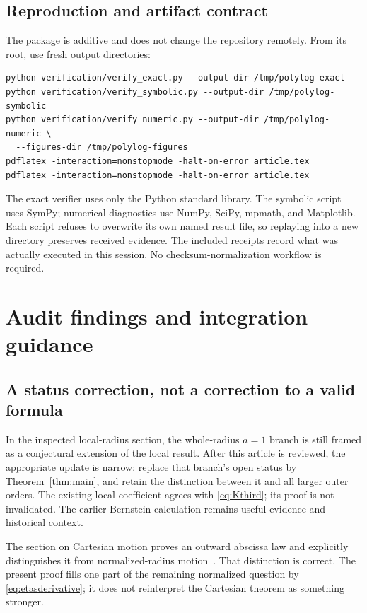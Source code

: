 \documentclass[11pt]{article}
\numberwithin{equation}{section}
\theoremstyle{definition}
\theoremstyle{remark}
\begin{document}
\subsection{Reproduction and artifact contract}
The package is additive and does not change the repository remotely.
From its root, use fresh output directories:
\begin{verbatim}
python verification/verify_exact.py --output-dir /tmp/polylog-exact
python verification/verify_symbolic.py --output-dir /tmp/polylog-symbolic
python verification/verify_numeric.py --output-dir /tmp/polylog-numeric \
  --figures-dir /tmp/polylog-figures
pdflatex -interaction=nonstopmode -halt-on-error article.tex
pdflatex -interaction=nonstopmode -halt-on-error article.tex
\end{verbatim}
The exact verifier uses only the Python standard library. The symbolic
script uses SymPy; numerical diagnostics use NumPy, SciPy, mpmath, and
Matplotlib. Each script refuses to overwrite its own named result file,
so replaying into a new directory preserves received evidence. The
included receipts record what was actually executed in this session.
No checksum-normalization workflow is required.

\section{Audit findings and integration guidance}
\label{sec:audit}
\subsection{A status correction, not a correction to a valid formula}
In the inspected local-radius section, the whole-radius $a=1$ branch
is still framed as a conjectural extension of the local result.
After this article is reviewed, the appropriate update is narrow:
replace that branch's open status by Theorem~\ref{thm:main}, and retain
the distinction between it and all larger outer orders. The existing
local coefficient agrees with \eqref{eq:Kthird}; its proof is not
invalidated. The earlier Bernstein calculation remains useful evidence
and historical context.

The section on Cartesian motion proves an outward abscissa law and
explicitly distinguishes it from normalized-radius motion~\cite{repo-cartesian}.
That distinction is correct. The present proof fills one part of the
remaining normalized question by \eqref{eq:etasderivative}; it does
not reinterpret the Cartesian theorem as something stronger.
\end{document}
